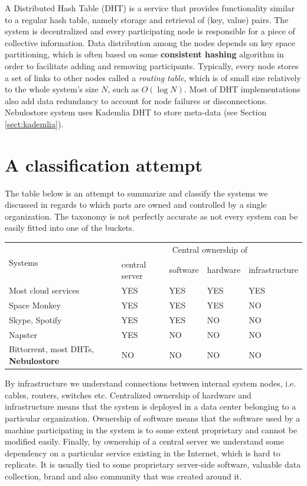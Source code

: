 \documentclass{pracamgren}
\newcounter{collective_ctr} \numberwithin{collective_ctr}{chapter}
\begin{document}
A Distributed Hash Table (DHT) is a service that provides functionality similar to a regular hash table, namely storage and retrieval of (key, value) pairs. The system is decentralized and every participating node is responsible for a piece of collective information. Data distribution among the nodes depends on key space partitioning, which is often based on some {\bf consistent hashing} algorithm in order to facilitate adding and removing participants. Typically, every node stores a set of links to other nodes called a {\it routing table}, which is of small size relatively to the whole system's size $N$, such as $O(\log N)$. Most of DHT implementations also add data redundancy to account for node failures or disconnections. Nebulostore system uses Kademlia \cite{kademlia} DHT to store meta-data (see Section \ref{sect:kademlia}).\\

\section{A classification attempt}

The table below is an attempt to summarize and classify the systems we discussed in regards to which parts are owned and controlled by a single organization. The taxonomy is not perfectly accurate as not every system can be easily fitted into one of the buckets.

\begin{center}
    \begin{tabular}{ | l | l | l | l | l |}
    \hline
    \multirow{2}{*}{Systems} & \multicolumn{4}{|c|}{Central ownership of} \\
    \cline{2-5}
     & central server & software & hardware & infrastructure \\
    \hline
    Most cloud services & YES & YES & YES & YES \\
    \hline
    Space Monkey & YES & YES & YES & NO \\
    \hline
    Skype, Spotify & YES & YES & NO & NO\\
    \hline
    Napster & YES & NO & NO & NO\\
    \hline
    Bittorrent, most DHTs, {\bf Nebulostore} & NO & NO & NO & NO \\
    \hline
    \end{tabular}
\end{center}

By infrastructure we understand connections between internal system nodes, i.e. cables, routers, switches etc.
Centralized ownership of hardware and infrastructure means that the system is deployed in a data center belonging to a particular organization. Ownership of software means that the software used by a machine participating in the system is to some extent proprietary and cannot be modified easily. Finally, by ownership of a central server we understand some dependency on a particular service existing in the Internet, which is hard to replicate. It is usually tied to some proprietary server-side software, valuable data collection, brand and also community that was created around it.\\
\end{document}
